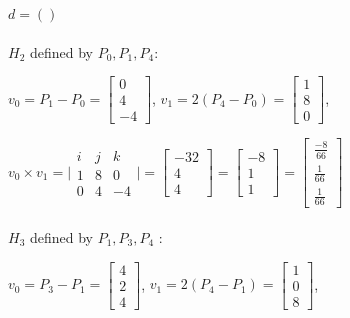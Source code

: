 \documentclass{article}
\begin{document}
\begin{enumerate}
        $d = ()$
        \paragraph{} $H_2$ defined by $P_0,P_1,P_4$:

        $v_0 = P_1 - P_0 = \begin{bmatrix} 0 \\ 4 \\ -4 \end{bmatrix}$,
        $v_1 = 2(P_4 - P_0) = \begin{bmatrix} 1  \\ 8 \\ 0 \end{bmatrix}$,

        $ v_0 \times v_1  = \Bigg | \begin{matrix}
            i & j & k \\
            1 & 8 & 0\\
            0 & 4 & -4 

        \end{matrix} \Bigg | = \begin{bmatrix} -32 \\ 4 \\ 4 \end{bmatrix} = \begin{bmatrix} -8 \\ 1 \\ 1 \end{bmatrix}  = \begin{bmatrix} \frac{-8}{66} \\ \frac{1}{66} \\ \frac{1}{66} \end{bmatrix}$

        \paragraph{} $H_3$ defined by $P_1,P_3,P_4$ :

        $v_0 = P_3 - P_1 = \begin{bmatrix} 4 \\ 2 \\ 4 \end{bmatrix}$,
        $v_1 = 2(P_4 - P_1) = \begin{bmatrix} 1  \\ 0 \\ 8 \end{bmatrix}$,


\end{enumerate}
\end{document}
